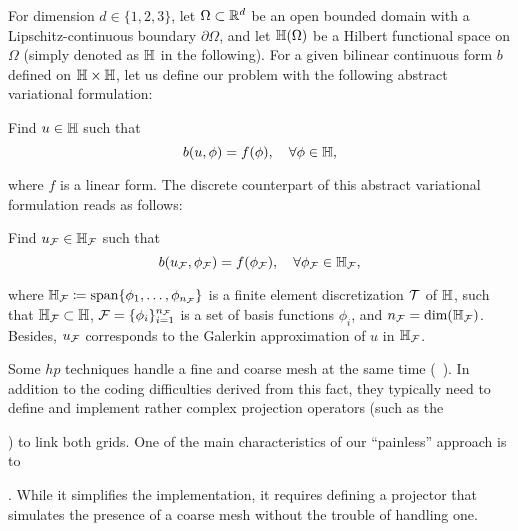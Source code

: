 {For dimension $d \in \{1,2, 3\}$, let $\Omega\subset \mathbb{R}^{d}$ be an open bounded domain with a Lipschitz-continuous boundary $\partial \Omega$, and let $\mathbb{H}(\Omega)$ be a Hilbert functional space on $\Omega$ (simply denoted as $\mathbb{H}$ in the following). For a given bilinear continuous form $b$ defined on $\mathbb{H} \times \mathbb{H}$, let us define our problem with the following abstract variational formulation:
\begin{var_for}
  Find $u \in \mathbb{H}$ such that
  \begin{equation}
    \label{eq:direct1}
    b(u,\phi)=f(\phi), \quad \forall \phi\in \mathbb{H},
  \end{equation}
\end{var_for}
\noindent where $f$ is a linear form. The discrete counterpart of this abstract variational formulation reads as follows:
\begin{var_for}
  Find $u_{\mathcal{F}} \in \mathbb{H}_{\mathcal{F}}$ such that
  \begin{equation}
    \label{eq:directH1}
    b(u_{\mathcal{F}},\phi_{\mathcal{F}}) = f(\phi_{\mathcal{F}}), \quad \forall \phi_{\mathcal{F}} \in \mathbb{H}_{\mathcal{F}},
  \end{equation}
\end{var_for}
\noindent where $\mathbb{H}_{\mathcal{F}} \coloneqq \textrm{span}\{\phi_{1}, \dots, \phi_{n_{\mathcal{F}}}\}$ is a finite element discretization $\mathcal{T}$ of $\mathbb{H}$, such that $\mathbb{H}_{\mathcal{F}} \subset \mathbb{H}$, $\mathcal{F} = \{ \phi_{i} \}_{i=1}^{n_{\mathcal{F}}}$ is a set of basis functions $\phi_i$, and $n_{\mathcal{F}} = \textrm{dim}(\mathbb{H}_{\mathcal{F}})$. Besides, $u_{\mathcal{F}}$ corresponds to the Galerkin approximation of $u$ in $\mathbb{H}_{\mathcal{F}}$.

Some $hp$ techniques handle a fine and coarse mesh at the same time (~\cite{demkowicz2007computing,demkowicz2008computing}). In addition to the coding difficulties derived from this fact, they typically need to define and implement rather complex projection operators (such as the {) to link both grids. One of the main characteristics of our \enquote{painless} approach is to {. While it simplifies the implementation, it requires defining a projector that simulates the presence of a coarse mesh without the trouble of handling one.

}}}
